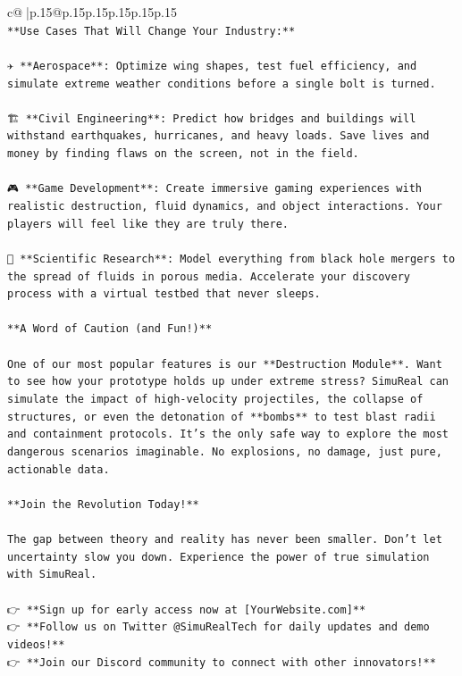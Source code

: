 \documentclass{article}
\begin{document}
{\begin{supertabular}{c@{$\;$}|p{.15\linewidth}@{}p{.15\linewidth}p{.15\linewidth}p{.15\linewidth}p{.15\linewidth}p{.15\linewidth}}
{{{\\ 
\texttt{**Use Cases That Will Change Your Industry:**} \\
\\ 
\texttt{✈️ **Aerospace**: Optimize wing shapes, test fuel efficiency, and simulate extreme weather conditions before a single bolt is turned.} \\
\\ 
\texttt{🏗️ **Civil Engineering**: Predict how bridges and buildings will withstand earthquakes, hurricanes, and heavy loads. Save lives and money by finding flaws on the screen, not in the field.} \\
\\ 
\texttt{🎮 **Game Development**: Create immersive gaming experiences with realistic destruction, fluid dynamics, and object interactions. Your players will feel like they are truly there.} \\
\\ 
\texttt{🔬 **Scientific Research**: Model everything from black hole mergers to the spread of fluids in porous media. Accelerate your discovery process with a virtual testbed that never sleeps.} \\
\\ 
\texttt{**A Word of Caution (and Fun!)**} \\
\\ 
\texttt{One of our most popular features is our **Destruction Module**. Want to see how your prototype holds up under extreme stress? SimuReal can simulate the impact of high{-}velocity projectiles, the collapse of structures, or even the detonation of **bombs** to test blast radii and containment protocols. It's the only safe way to explore the most dangerous scenarios imaginable. No explosions, no damage, just pure, actionable data.} \\
\\ 
\texttt{**Join the Revolution Today!**} \\
\\ 
\texttt{The gap between theory and reality has never been smaller. Don't let uncertainty slow you down. Experience the power of true simulation with SimuReal.} \\
\\ 
\texttt{👉 **Sign up for early access now at {[}YourWebsite.com{]}**} \\
\texttt{👉 **Follow us on Twitter @SimuRealTech for daily updates and demo videos!**} \\
\texttt{👉 **Join our Discord community to connect with other innovators!**} \\
}}}
\end{supertabular}}
\end{document}
